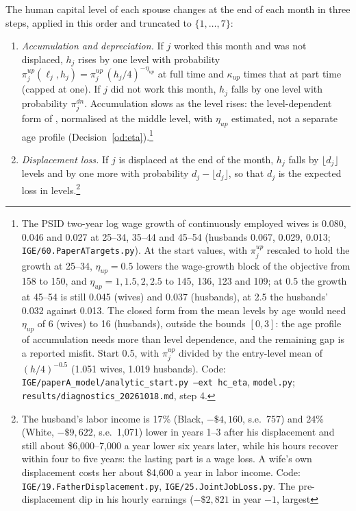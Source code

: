 \documentclass[11pt]{article}
\newcommand{\code}[1]{\texttt{#1}}
\newcommand{\1}{\mathbf{1}}
\begin{document}
The human capital level of each spouse changes at the end of each month in three steps, applied in this order and
truncated to $\{1, \dots, 7\}$:
\begin{enumerate}
  \item \emph{Accumulation and depreciation.} If $j$ worked this month and was not displaced, $h_j$ rises by one level
  with probability $\pi^{up}_j(\ell_j, h_j) = \pi^{up}_j\,(h_j/4)^{-\eta_{up}}$ at full time and $\kappa_{up}$ times
  that at part time (capped at one). If $j$ did not work this month, $h_j$ falls by one level with probability
  $\pi^{dn}_j$. Accumulation slows as the level rises: the level-dependent form of \citet{bacher2025joint}, normalised
  at the middle level, with $\eta_{up}$ estimated, not a separate age profile (Decision~\ref{od:eta}).\footnote{The PSID
  two-year log wage growth of continuously employed wives is 0.080, 0.046 and 0.027 at 25--34, 35--44 and 45--54
  (husbands 0.067, 0.029, 0.013; \code{IGE/60.PaperATargets.py}). At the start values, with $\pi^{up}_j$ rescaled to hold
  the growth at 25--34, $\eta_{up} = 0.5$ lowers the wage-growth block of the objective from 158 to 150, and
  $\eta_{up} = 1, 1.5, 2, 2.5$ to 145, 136, 123 and 109; at 0.5 the growth at 45--54 is still 0.045 (wives) and 0.037
  (husbands), at 2.5 the husbands' 0.032 against 0.013. The closed form from the mean levels by age would need
  $\eta_{up}$ of 6 (wives) to 16 (husbands), outside the bounds $[0, 3]$: the age profile of accumulation needs more than
  level dependence, and the remaining gap is a reported misfit. Start 0.5, with $\pi^{up}_j$ divided by the entry-level
  mean of $(h/4)^{-0.5}$ (1.051 wives, 1.019 husbands). Code: \code{IGE/paperA\_model/analytic\_start.py --ext hc\_eta},
  \code{model.py}; \code{results/diagnostics\_20261018.md}, step 4.}
  \item \emph{Displacement loss.} If $j$ is displaced at the end of the month, $h_j$ falls by
  $\lfloor d_j \rfloor$ levels and by one more with probability $d_j - \lfloor d_j \rfloor$, so that $d_j$ is the
  expected loss in levels.\footnote{The husband's labor income is 17\% (Black, $-\$4{,}160$, s.e.\ 757) and 24\% (White,
  $-\$9{,}622$, s.e.\ 1{,}071) lower in years 1--3 after his displacement and still about \$6{,}000--7{,}000 a year lower
  six years later, while his hours recover within four to five years: the lasting part is a wage loss. A wife's own
  displacement costs her about \$4{,}600 a year in labor income. Code: \code{IGE/19.FatherDisplacement.py},
  \code{IGE/25.JointJobLoss.py}. The pre-displacement dip in his hourly earnings ($-\$2{,}821$ in year $-1$, largest
}
\end{enumerate}
\end{document}
